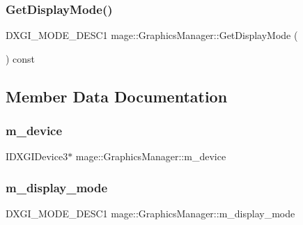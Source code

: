 \subsubsection{\texorpdfstring{Get\+Display\+Mode()}{GetDisplayMode()}}
{\footnotesize\ttfamily D\+X\+G\+I\+\_\+\+M\+O\+D\+E\+\_\+\+D\+E\+S\+C1 mage\+::\+Graphics\+Manager\+::\+Get\+Display\+Mode (\begin{DoxyParamCaption}{ }\end{DoxyParamCaption}) const}



\subsection{Member Data Documentation}
\hypertarget{classmage_1_1_graphics_manager_a81b093270faff50b5f13519cfff5b582}{}\label{classmage_1_1_graphics_manager_a81b093270faff50b5f13519cfff5b582} 
\subsubsection{\texorpdfstring{m\+\_\+device}{m\_device}}
{\footnotesize\ttfamily I\+D\+X\+G\+I\+Device3$\ast$ mage\+::\+Graphics\+Manager\+::m\+\_\+device\hspace{0.3cm}{\ttfamily [private]}}

\hypertarget{classmage_1_1_graphics_manager_a005c179f3c0c47487542babde894e752}{}\label{classmage_1_1_graphics_manager_a005c179f3c0c47487542babde894e752} 
\subsubsection{\texorpdfstring{m\+\_\+display\+\_\+mode}{m\_display\_mode}}
{\footnotesize\ttfamily D\+X\+G\+I\+\_\+\+M\+O\+D\+E\+\_\+\+D\+E\+S\+C1 mage\+::\+Graphics\+Manager\+::m\+\_\+display\+\_\+mode\hspace{0.3cm}{\ttfamily [private]}}

